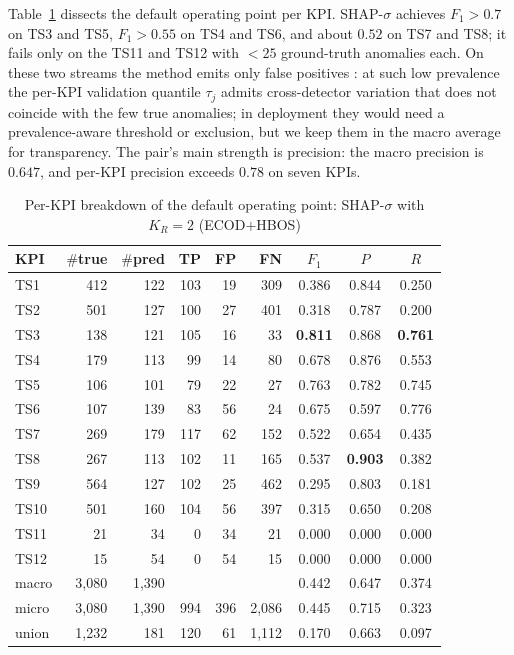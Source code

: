 \documentclass[conference]{IEEEtran}
\begin{document}
Table~\ref{tab:perkpi} dissects the default operating point per KPI. SHAP-$\sigma$ achieves $F_1{>}0.7$ on TS3 and
TS5, $F_1{>}0.55$ on TS4 and TS6, and about $0.52$ on TS7 and TS8; it
fails only on the TS11 and TS12 with
$<25$ ground-truth anomalies each. On these two streams the method emits
only false positives : at such low prevalence the per-KPI validation quantile
$\tau_j$ admits cross-detector variation that does
not coincide with the few true anomalies; in deployment they would need a
prevalence-aware threshold or exclusion, but we keep them in the macro
average for transparency. The pair's main strength is precision: the
macro precision is $0.647$, and per-KPI precision exceeds $0.78$ on seven
KPIs.

\begin{table}[t]
  \centering
  \caption{Per-KPI breakdown of the default operating point: SHAP-$\sigma$ with $K_R=2$ (ECOD$+$HBOS) }
  \label{tab:perkpi}
  \scriptsize
  \setlength{\tabcolsep}{3pt}
  \renewcommand{\arraystretch}{1.0}
  \begin{tabular}{lrrrrrccc}
  \toprule
  KPI  & $\#$true & $\#$pred & TP  & FP  & FN  & $F_1$ & $P$ & $R$ \\
  \midrule
  TS1  & 412      & 122      & 103 & 19  & 309 & 0.386 & 0.844 & 0.250 \\
  TS2  & 501      & 127      & 100 & 27  & 401 & 0.318 & 0.787 & 0.200 \\
  TS3  & 138      & 121      & 105 & 16  & 33  & \textbf{0.811} & 0.868 & \textbf{0.761} \\
  TS4  & 179      & 113      & 99  & 14  & 80  & 0.678 & 0.876 & 0.553 \\
  TS5  & 106      & 101      & 79  & 22  & 27  & 0.763 & 0.782 & 0.745 \\
  TS6  & 107      & 139      & 83  & 56  & 24  & 0.675 & 0.597 & 0.776 \\
  TS7  & 269      & 179      & 117 & 62  & 152 & 0.522 & 0.654 & 0.435 \\
  TS8  & 267      & 113      & 102 & 11  & 165 & 0.537 & \textbf{0.903} & 0.382 \\
  TS9  & 564      & 127      & 102 & 25  & 462 & 0.295 & 0.803 & 0.181 \\
  TS10 & 501      & 160      & 104 & 56  & 397 & 0.315 & 0.650 & 0.208 \\
  TS11 & 21       & 34       & 0   & 34  & 21  & 0.000 & 0.000 & 0.000 \\
  TS12 & 15       & 54       & 0   & 54  & 15  & 0.000 & 0.000 & 0.000 \\
  \midrule
  macro & 3{,}080  & 1{,}390  &     &     &     & 0.442 & 0.647 & 0.374 \\
  micro & 3{,}080  & 1{,}390  & 994 & 396 & 2{,}086 & 0.445 & 0.715 & 0.323 \\
  union & 1{,}232  & 181      & 120 & 61  & 1{,}112 & 0.170 & 0.663 & 0.097 \\
  \bottomrule
  \end{tabular}
  \end{table}
\end{document}
